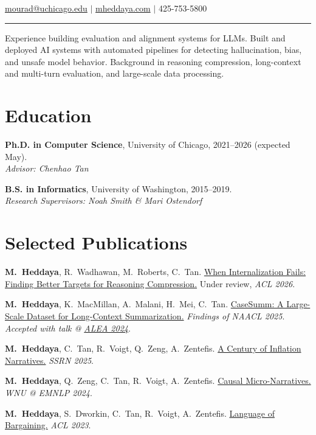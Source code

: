 \documentclass[11pt,letterpaper]{article}
\begin{document}
\hfill{\normalsize \href{mailto:mourad@uchicago.edu}{mourad@uchicago.edu} $|$ \href{https://mheddaya.com}{mheddaya.com} $|$ 425-753-5800}
\vspace{2pt}
\hrule

\vspace{12pt}
\noindent Experience building evaluation and alignment systems for LLMs. Built and deployed AI systems with automated pipelines for detecting hallucination, bias, and unsafe model behavior. Background in reasoning compression, long-context and multi-turn evaluation, and large-scale data processing.

\section*{Education}

\noindent \textbf{Ph.D. in Computer Science}, University of Chicago, 2021--2026 (expected May).\\
\hspace*{2em}\textit{Advisor: Chenhao Tan}

\vspace{4pt}

\noindent \textbf{B.S. in Informatics}, University of Washington, 2015--2019.\\
\hspace*{2em}\textit{Research Supervisors: Noah Smith \& Mari Ostendorf}

\section*{Selected Publications}
\vspace{4pt}
\begin{enumerate}[label={[\arabic*]}, leftmargin=2em, topsep=2pt, itemsep=1pt, parsep=0pt]
    \item \textbf{M.\ Heddaya}, R.\ Wadhawan, M.\ Roberts, C.\ Tan. \href{https://mheddaya.com/papers/acl2026_abridge.pdf}{When Internalization Fails: Finding Better Targets for Reasoning Compression.} Under review, \textit{ACL 2026}.
    \item \textbf{M.\ Heddaya}, K.\ MacMillan, A.\ Malani, H.\ Mei, C.\ Tan. \href{https://arxiv.org/abs/2501.00097}{CaseSumm: A Large-Scale Dataset for Long-Context Summarization.} \textit{Findings of NAACL 2025}. \textit{Accepted with talk @ \href{https://alea2024.github.io/}{ALEA 2024}}.
    \item \textbf{M.\ Heddaya}, C.\ Tan, R.\ Voigt, Q.\ Zeng, A.\ Zentefis. \href{https://papers.ssrn.com/sol3/papers.cfm?abstract_id=5259107}{A Century of Inflation Narratives.} \textit{SSRN 2025}.
    \item \textbf{M.\ Heddaya}, Q.\ Zeng, C.\ Tan, R.\ Voigt, A.\ Zentefis. \href{https://aclanthology.org/2024.wnu-1.12/}{Causal Micro-Narratives.} \textit{WNU @ EMNLP 2024}.
    \item \textbf{M.\ Heddaya}, S.\ Dworkin, C.\ Tan, R.\ Voigt, A.\ Zentefis. \href{https://aclanthology.org/2023.acl-long.735/}{Language of Bargaining.} \textit{ACL 2023}.
\end{enumerate}
\end{document}
